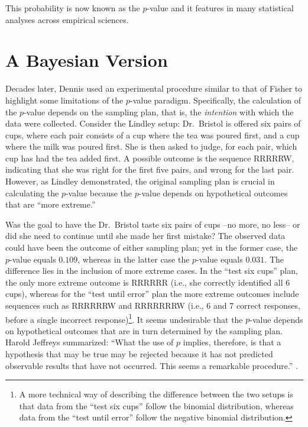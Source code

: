 \documentclass[
]{book}
\begin{document}
This probability is now known as the \(p\)-value and it features in many statistical analyses across empirical sciences.

\hypertarget{a-bayesian-version}{%
\section{A Bayesian Version}\label{a-bayesian-version}}

Decades later, Dennis \citet{Lindley1993} used an experimental procedure similar to that of Fisher to highlight some limitations of the \(p\)-value paradigm. Specifically, the calculation of the \(p\)-value depends on the sampling plan, that is, the \textit{intention} with which the data were collected. Consider the Lindley setup: Dr.~Bristol is offered six pairs of cups, where each pair consists of a cup where the tea was poured first, and a cup where the milk was poured first. She is then asked to judge, for each pair, which cup has had the tea added first. A possible outcome is the sequence RRRRRW, indicating that she was right for the first five pairs, and wrong for the last pair. However, as Lindley demonstrated, the original sampling plan is crucial in calculating the \(p\)-value because the \(p\)-value depends on hypothetical outcomes that are ``more extreme.''

Was the goal to have the Dr.~Bristol taste six pairs of cups --no more, no less-- or did she need to continue until she made her first mistake? The observed data could have been the outcome of either sampling plan; yet in the former case, the \(p\)-value equals \(0.109\), whereas in the latter case the \(p\)-value equals \(0.031\). The difference lies in the inclusion of more extreme cases. In the ``test six cups'' plan, the only more extreme outcome is RRRRRR (i.e., she correctly identified all 6 cups), whereas for the ``test until error'' plan the more extreme outcomes include sequences such as RRRRRRW and RRRRRRRW (i.e., 6 and 7 correct responses, before a single incorrect response)\footnote{A more technical way of describing the difference between the two setups is that data from the ``test six cups'' follow the binomial distribution, whereas data from the ``test until error'' follow the negative binomial distribution.}. It seems undesirable that the \(p\)-value depends on hypothetical outcomes that are in turn determined by the sampling plan. Harold Jeffreys summarized:
``What the use of \(p\) implies, therefore, is that a hypothesis that may be true may be rejected because it has not predicted observable results that have not occurred. This seems a remarkable procedure.'' \citep[p385]{Jeffreys1961}.
\end{document}
